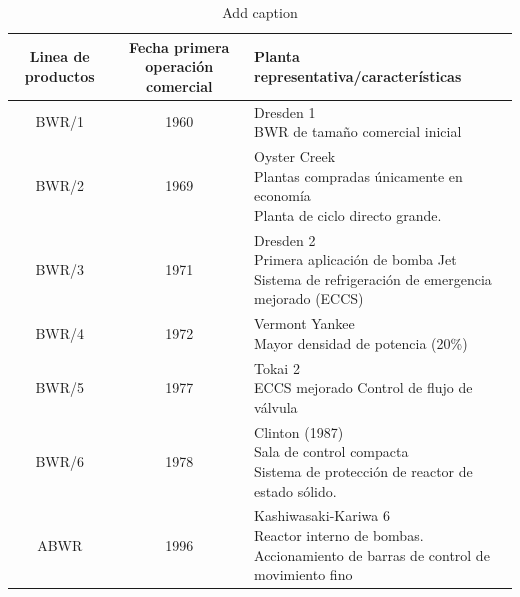 \documentclass[letterpaper,10pt,table, dvipsnames]{article}
\begin{document}
\begin{table}[htbp]
\centering
\caption{Add caption}
\begin{tabular}{|c|c|p{25em}|}
\hline
\multicolumn{1}{|p{5.355em}|}{\textbf{Linea de productos}} & \multicolumn{1}{p{12em}|}{\textbf{Fecha primera operación comercial}} & \textbf{Planta representativa/características} \\ \hline
BWR/1 & 1960 & \makecell{Dresden 1 \\ BWR de tamaño comercial inicial} \\\hline
BWR/2 & 1969 & \makecell{Oyster Creek \\ Plantas compradas únicamente en economía \\ Planta de ciclo directo grande.} \\ \hline
BWR/3 & 1971 & \makecell{Dresden 2 \\ Primera aplicación de bomba Jet \\ Sistema de refrigeración de emergencia mejorado (ECCS)} \\ \hline
BWR/4 & 1972 & \makecell{Vermont Yankee \\ Mayor densidad de potencia (20\%)} \\ \hline
BWR/5 & 1977 & \makecell{Tokai 2 \\ ECCS mejorado Control de flujo de válvula} \\ \hline
BWR/6 & 1978 & \makecell{Clinton (1987) \\ Sala de control compacta \\ Sistema de protección de reactor de estado sólido.} \\ \hline
ABWR & 1996 & \makecell{Kashiwasaki-Kariwa 6 \\ Reactor interno de bombas. \\ Accionamiento de barras de control de movimiento fino} \\ \hline
\end{tabular}
\label{tab:tabla1}
\end{table}
\end{document}
